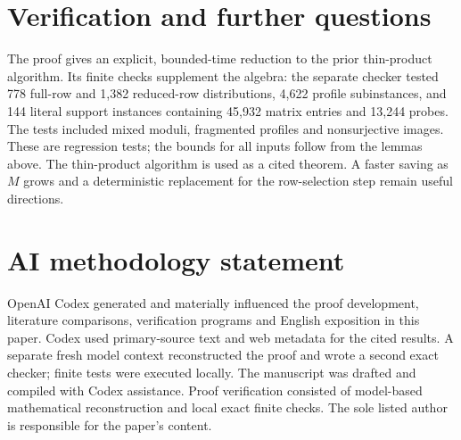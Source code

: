 \documentclass[acmsmall,11pt,nonacm,natbib=false]{acmart}
\begin{document}
\section{Verification and further questions}

The proof gives an explicit, bounded-time reduction to the prior
thin-product algorithm. Its finite checks supplement the algebra: the
separate checker tested 778 full-row and 1,382 reduced-row distributions,
4,622 profile subinstances, and 144 literal support instances containing
45,932 matrix entries and 13,244 probes. The tests included mixed moduli,
fragmented profiles and nonsurjective images. These are regression tests;
the bounds for all inputs follow from the lemmas above. The thin-product
algorithm is used as a cited theorem. A faster saving as $M$ grows and a
deterministic replacement for the row-selection step remain useful
directions.




\section*{AI methodology statement}
OpenAI Codex generated and materially influenced the proof development,
literature comparisons, verification programs and English exposition in
this paper. Codex used primary-source text and web metadata for the cited
results. A separate fresh model context reconstructed the proof and wrote
a second exact checker; finite tests were executed locally. The manuscript
was drafted and compiled with Codex assistance. Proof verification consisted
of model-based mathematical reconstruction and local exact finite checks.
The sole listed author is responsible for the paper's content.
\end{document}
